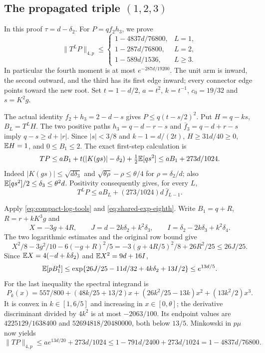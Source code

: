 \subsection[The propagated triple (1,2,3)]{The propagated triple $(1,2,3)$}\label{loc:S22}
In this proof $\tau=d-\delta_{2}$.
For $P=qf_2h_3$, we prove
\[
 \|T^LP\|_{4,p}\le
 \begin{cases}1-4837d/76800,&L=1,\\
 1-287d/76800,&L=2,\\1-589d/1536,&L\ge3.
 \end{cases}
\]
In particular the fourth moment is at most $e^{-287d/19200}$.
The unit arm is inward, the second outward, and the third has its first
edge inward; every connector edge points toward the new root.
Set $t=1-d/2$, $a=t^2$, $k=t^{-1}$, $c_0=19/32$ and $s=K^2g$.

The actual identity $f_2+h_3=2-d-s$ gives
$P\le q(t-s/2)^2$. Put $H=q-ks$, $B_L=T^LH$.
The two positive paths $h_3=q-d-r-s$ and $\bar f_{3}=q-d+r-s$ imply
$q-s\ge d+|r|$. Since $|s|<3/8$ and $k-1=d/(2t)$,
$H\ge31d/40\ge0$, $\mathbb E H=1$, and $0\le B_1\le2$.
The exact first-step calculation is
\[
 TP\le aB_1+t(|K(gs)|-\delta_{2})+\tfrac12\mathbb E[qs^2]
       \le aB_1+273d/1024.
\]
Indeed $|K(gs)|\le\sqrt{d\delta_{3}}$ and
$\sqrt{\theta\rho}-\rho\le\theta/4$ for $\rho=\delta_{2}/d$;
also $\mathbb E[qs^2]/2\le \delta_{3}\le\theta^2d$.
Positivity consequently gives, for every $L$,
\begin{equation}\label{eq:compact-123-comparison}
 T^LP\le aB_L+(273/1024)d\,\bar f_{L-1}.
\end{equation}

Apply \eqref{eq:compact-log-tools} and \eqref{eq:shared-exp-eighth}. Write $B_1=q+R$, $R=r+kK^3g$ and
\[
 X=-3g+4R,\qquad J=d-2k\delta_{2}+k^2\delta_{3},\qquad I=\delta_{2}-2k\delta_{3}+k^2\delta_{4}.
\]
The two logarithmic estimates and the original row bound give
\[
 X^2/8-3g^2/10-6(-g+R)^2/5
 =-3(g+4R/5)^2/8+26R^2/25\le26J/25.
\]
Since $\mathbb E X=4(-d+k\delta_{2})$ and $\mathbb E X^2=9d+16I$,
\[
 \mathbb E[pB_1^4]\le
 \exp\{26J/25-11d/32+4k\delta_{2}+13I/2\}\le e^{13d/5}.
\]
For the last inequality the spectral integrand is
\[
 P_k(x)=557/800+(48k/25+13/2)x
              +(26k^2/25-13k)x^2+(13k^2/2)x^3.
\]
It is convex in $k\in[1,6/5]$ and increasing in $x\in[0,\theta]$;
the derivative discriminant divided by $4k^2$ is at most $-2063/100$.
Its endpoint values are $4225129/1638400$ and $52694818/20480000$,
both below $13/5$. Minkowski in $p\mu$ now yields
\[
 \|TP\|_{4,p}\le ae^{13d/20}+273d/1024
 \le1-791d/2400+273d/1024=1-4837d/76800.
\]

